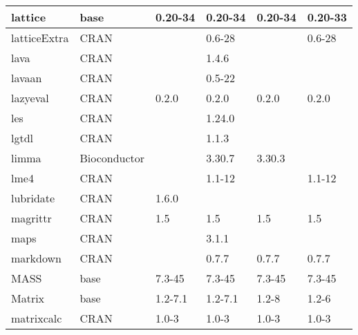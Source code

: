 \begin{longtable}{@{\extracolsep{\fill}}|l|l|l|l|l|l|@{}}
lattice                       & base                      & 0.20-34     & 0.20-34     & 0.20-34        & 0.20-33          \\ \hline
latticeExtra                  & CRAN                      &             & 0.6-28      &                & 0.6-28           \\ \hline
lava                          & CRAN                      &             & 1.4.6       &                &                  \\ \hline
lavaan                        & CRAN                      &             & 0.5-22      &                &                  \\ \hline
lazyeval                      & CRAN                      & 0.2.0       & 0.2.0       & 0.2.0          & 0.2.0            \\ \hline
les                           & CRAN                      &             & 1.24.0      &                &                  \\ \hline
lgtdl                         & CRAN                      &             & 1.1.3       &                &                  \\ \hline
limma                         & Bioconductor              &             & 3.30.7      & 3.30.3         &                  \\ \hline
lme4                          & CRAN                      &             & 1.1-12      &                & 1.1-12           \\ \hline
lubridate                     & CRAN                      & 1.6.0       &             &                &                  \\ \hline
magrittr                      & CRAN                      & 1.5         & 1.5         & 1.5            & 1.5              \\ \hline
maps                          & CRAN                      &             & 3.1.1       &                &                  \\ \hline
markdown                      & CRAN                      &             & 0.7.7       & 0.7.7          & 0.7.7            \\ \hline
MASS                          & base                      & 7.3-45      & 7.3-45      & 7.3-45         & 7.3-45           \\ \hline
Matrix                        & base                      & 1.2-7.1     & 1.2-7.1     & 1.2-8          & 1.2-6            \\ \hline
matrixcalc                    & CRAN                      & 1.0-3       & 1.0-3       & 1.0-3          & 1.0-3            \\ \hline

\end{longtable}
